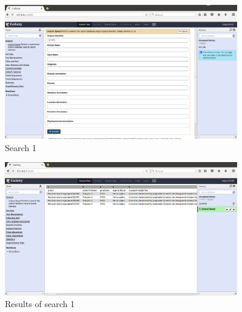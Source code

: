 \documentclass[12pt]{article}
\begin{document}
\begin{figure}[h]
	\includegraphics[width=0.9\textwidth]{figures/1a}
	\caption{Search 1}
	\label{fig:example_1a}
\end{figure}
\begin{figure}[h]
	\includegraphics[width=0.9\textwidth]{figures/1b}
	\caption{Results of search 1}
	\label{fig:example_1b}
\end{figure}
\end{document}
